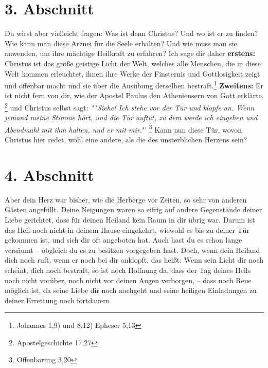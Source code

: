 \section{3. Abschnitt}  \label{kap2_ab3}

\label{ref:02_03_gott_in_jedem}
Du wirst aber vielleicht fragen: Was ist denn Christus? Und wo ist er zu finden?
Wie kann man diese Arznei für die Seele erhalten? Und wie muss man sie anwenden,
um ihre mächtige Heilkraft zu erfahren? Ich sage dir daher \textbf{erstens:}
Christus ist das große geistige Licht der Welt, welches alle Menschen, die in
diese Welt kommen erleuchtet, ihnen ihre Werke der Finsternis und Gottlosigkeit
zeigt und offenbar macht und sie über die Ausübung derselben
bestraft.\footnote{Johannes 1,9) und 8,12) Epheser 5,13}
\textbf{Zweitens:} Er ist nicht fern von dir, wie der
Apostel Paulus den Atheniensern von Gott erklärte,
\footnote{Apostelgeschichte 17,27}
und Christus selbst sagt:
\textit{"`Siehe! Ich stehe vor der Tür und klopfe an.
Wenn jemand meine Stimme hört, und die Tür auftut, zu dem werde ich eingehen
und Abendmahl mit ihm halten, und er mit mir.}"'
\footnote{Offenbarung 3,20}
Kann 
nun diese Tür, wovon Christus hier redet, wohl eine andere, als die des
unsterblichen Herzens sein?

\section{4. Abschnitt}  \label{kap2_ab4}

Aber dein Herz war bisher, wie die Herberge vor Zeiten, so sehr von anderen
Gästen angefüllt. Deine Neigungen waren so eifrig auf andere Gegenstände deiner
Liebe gerichtet, dass für deinen Heiland kein Raum in dir übrig war. Darum ist
das Heil noch nicht in deinem Hause eingekehrt, wiewohl es bis zu deiner Tür
gekommen ist, und sich dir oft angeboten hat. Auch hast du es schon lange
versäumt -- obgleich du es zu besitzen vorgegeben hast. Doch, wenn dein Heiland
dich noch ruft, wenn er noch bei dir anklopft, das heißt: Wenn sein Licht dir
noch scheint, dich noch bestraft, so ist noch Hoffnung da, dass der Tag deines
Heils noch nicht vorüber, noch nicht vor deinen Augen verborgen, -- dass noch
Reue
möglich ist, da seine Liebe dir noch nachgeht und seine heiligen Einladungen
zu deiner Errettung noch fortdauern.

